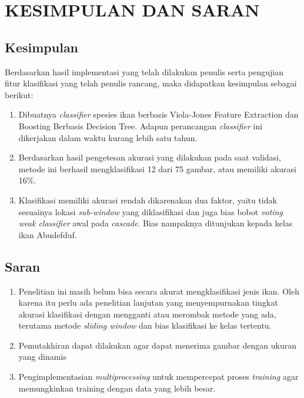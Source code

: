 
\chapter{KESIMPULAN DAN SARAN}

\section{Kesimpulan}
Berdasarkan hasil implementasi yang telah dilakukan penulis serta pengujian fitur klasifikasi yang 
telah penulis rancang, maka didapatkan kesimpulan sebagai berikut:

\begin{enumerate}
	\item Dibuatnya \textit{classifier} spesies ikan berbasis Viola-Jones Feature Extraction dan Boosting
	Berbasis Decision Tree. Adapun perancangan \textit{classifier} ini dikerjakan dalam 
	waktu kurang lebih satu tahun.

	\item Berdasarkan hasil pengetesan akurasi yang dilakukan pada saat validasi, metode ini 
	berhasil mengklasifikasi 12 dari 75 gambar, atau memiliki akurasi 16\%.

	\item Klasifikasi memiliki akurasi rendah dikarenakan dua faktor, yaitu tidak 
	sesuainya lokasi \emph{sub-window} yang diklasifikasi dan juga bias bobot \textit{voting} 
	\emph{weak classifier} awal pada \emph{cascade}. Bias nampaknya ditunjukan kepada kelas 
	ikan Abudefduf.

\end{enumerate}

\section{Saran}
\begin{enumerate}
	\item Penelitian ini masih belum bisa secara akurat mengklasifikasi jenis ikan. Oleh 
	karena itu perlu ada penelitian lanjutan yang menyempurnakan tingkat akurasi klasifikasi 
	dengan mengganti atau merombak metode yang ada, terutama metode \emph{sliding window} 
	dan bias klasifikasi ke kelas tertentu.
	\item Pemutakhiran dapat dilakukan agar dapat menerima gambar dengan ukuran yang 
	dinamis 
	\item Pengimplementasian \textit{multiprocessing} untuk mempercepat proses 
	\textit{training} agar memungkinkan training dengan data yang lebih besar.
\end{enumerate}

\begin{comment}

\end{comment}
